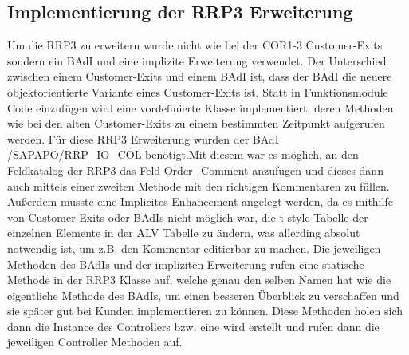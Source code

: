 \subsection{Implementierung der RRP3 Erweiterung}
\label{sec:Implementierung der RRP3 Erweiterung}   
Um die RRP3 zu erweitern wurde nicht wie bei der COR1-3 Customer-Exits sondern ein \ac{BAdI} und eine implizite Erweiterung verwendet. Der Unterschied zwischen einem Customer-Exits und einem \ac{BAdI} ist, dass der \ac{BAdI} die neuere objektorientierte Variante eines Customer-Exits ist. Statt in Funktionsmodule Code einzufügen wird eine vordefinierte Klasse implementiert, deren Methoden wie bei den alten Customer-Exits zu einem bestimmten Zeitpunkt aufgerufen werden. Für diese RRP3 Erweiterung wurden der \ac{BAdI} /SAPAPO/RRP\_IO\_COL benötigt.Mit diesem war es möglich, an den Feldkatalog der RRP3 das Feld Order\_Comment anzufügen und dieses dann auch mittels einer zweiten Methode mit den richtigen Kommentaren zu füllen. Außerdem musste eine Implicites Enhancement angelegt werden, da es mithilfe von Customer-Exits oder \ac{BAdI}s nicht möglich war, die t-style Tabelle der einzelnen Elemente in der \ac{ALV} Tabelle zu ändern, was allerding absolut notwendig ist, um z.B. den Kommentar editierbar zu machen. Die jeweiligen Methoden des \ac{BAdI}s und der impliziten Erweiterung rufen eine statische Methode in der RRP3 Klasse auf, welche genau den selben Namen hat wie die eigentliche Methode des \ac{BAdI}s, um einen besseren Überblick zu verschaffen und sie später gut bei Kunden implementieren zu können. Diese Methoden holen sich dann die Instance des Controllers bzw. eine wird erstellt und rufen dann die jeweiligen Controller Methoden auf.

